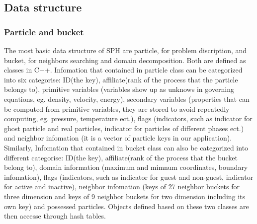 \documentclass[conference,compsoc]{IEEEtran}
\begin{document}
\subsection{Data structure}
\subsubsection{Particle and bucket}
The most basic data structure of SPH are particle, for problem discription, and bucket, for neighbors searching and domain decomposition. Both are defined as classes in C++. Infomation that contained in particle class can be categorized into six categorise: ID(the key), affiliate(rank of the process that the particle belongs to), primitive variables (variables show up as unknows in governing equations, eg. density, velocity, energy), secondary variables (properties that can be computed from primitive variables, they are stored to avoid repeatedly computing, eg. pressure, temperature ect.), flags (indicators, such as indicator for ghost particle and real particles, indicator for particles of different phases ect.) and neighbor infomation (it is a vector of particle keys in our application). Similarly,  Infomation that contained in bucket class can also be categorized into different categorise: ID(the key), affiliate(rank of the process that the bucket belong to), domain information (maximum and mimnum coordinates, boundary infomation), flags (indicators, such as indicator for guest and non-guest, indicator for active and inactive), neighbor infomation (keys of 27 neighbor buckets for three dimension and keys of 9 neighbor buckets for two dimension including its own key) and possessed particles. Objects defined based on these two classes are then accesse through hash tables.
\end{document}
